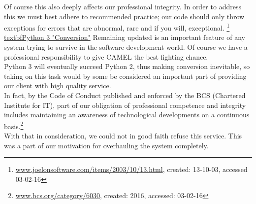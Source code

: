 Of course this also deeply affects our professional integrity. In order to address this we must best adhere to recommended practice; our code should only throw exceptions for errors that are abnormal, rare and if you will, exceptional. \footnote{\url{ www.joelonsoftware.com/items/2003/10/13.html}, created: 13-10-03, accessed 03-02-16}\\

\underline{textbf{Python 3 "Conversion"}}
Remaining updated is an important feature of any system trying to survive in the software development world. Of course we have a professional responsibility to give CAMEL the best fighting chance.\\

Python 3 will eventually succeed Python 2, thus making conversion inevitable, so taking on this task would by some be considered an important part of providing our client with high quality service.\\

In fact, by the Code of Conduct published and enforced by the BCS (Chartered Institute for IT), part of our obligation of professional competence and integrity includes maintaining an awareness of technological developments on a continuous basis.\footnote{\url{www.bcs.org/category/6030}, created: 2016, accessed: 03-02-16}\\

With that in consideration, we could not in good faith refuse this service. This was a part of our motivation for overhauling the system completely.\\



